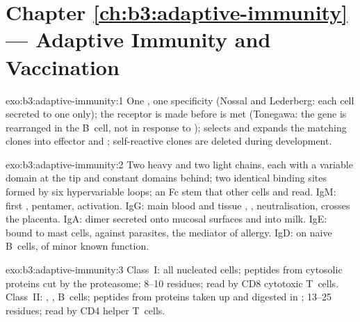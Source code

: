 \section*{Chapter \ref{ch:b3:adaptive-immunity} --- Adaptive Immunity and Vaccination}

\begin{solution}{exo:b3:adaptive-immunity:1}
One , one specificity (Nossal and Lederberg: each cell
secreted  to one  only); the receptor is made before
 is met (Tonegawa: the gene is rearranged in the B~cell, not in
response to );  selects and expands the matching clones
into effector and ; self-reactive clones are deleted during
development.
\end{solution}

\begin{solution}{exo:b3:adaptive-immunity:2}
Two heavy and two light chains, each with a variable domain at the tip
and constant domains behind; two identical binding sites formed by six
hypervariable loops; an Fc stem that other cells and  read.
IgM: first , pentamer,  activation. IgG: main blood
and tissue , , neutralisation, crosses the placenta.
IgA: dimer secreted onto mucosal surfaces and into milk. IgE: bound to
mast cells, against parasites, the mediator of allergy. IgD: on naive
B~cells, of minor known function.
\end{solution}

\begin{solution}{exo:b3:adaptive-immunity:3}
Class~I: all nucleated cells; peptides from cytosolic proteins cut by
the proteasome; 8--10 residues; read by CD8 cytotoxic T~cells. Class~II:
, , B~cells; peptides from proteins taken up
and digested in ; 13--25 residues; read by CD4 helper T~cells.
\end{solution}

